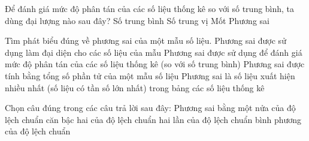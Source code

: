

\begin{ex}%
	Để đánh giá mức độ phân tán của các số liệu thống kê so với số trung bình, ta dùng đại lượng nào sau đây? 
	\choice 
		{Số  trung bình}
		{Số trung vị} 
		 {Mốt}
		{\True Phương sai} 
\end{ex}

\begin{ex}%
	Tìm phát biểu đúng về phương sai của một mẫu số  liệu.
	 \choice
		{Phương sai được sử dụng làm đại diện cho các số liệu của  mẫu}
		{\True Phương sai được sử dụng  để đánh giá mức độ phân tán của các số liệu thống kê (so với số trung bình)}
		{Phương sai được tính bằng tổng số phần tử  của một mẫu số liệu}
		{Phương sai là số liệu xuất hiện nhiều nhất (số liệu  có tần số lớn nhất) trong bảng các số
		liệu  thống kê}
\end{ex}

\begin{ex}%
	Chọn  câu đúng trong các câu trả lời sau đây: Phương sai bằng
	 \choice
		{một nửa  của độ lệch chuẩn}
		{căn bậc hai của độ  lệch chuẩn}
		{hai  lần của độ lệch chuẩn}
		 {\True bình phương của độ lệch chuẩn}
\end{ex}

